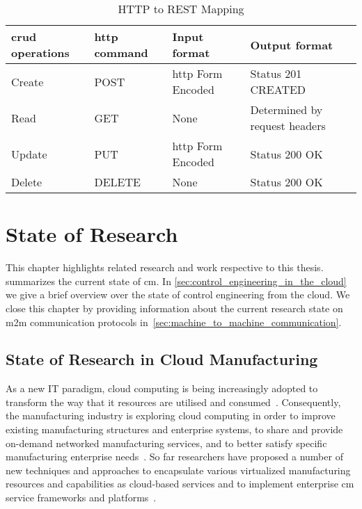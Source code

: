 \documentclass[
a4paper,
twoside,
headsepline,
cleardoublepage=empty,
parskip=half,
draft=false
]{scrbook}
\begin{document}
			\begin{table}[hbtp]
				\centering
				\caption{HTTP to REST Mapping}
				\label{tab:http_rest_mapping}
				\begin{tabular}{@{}llll@{}}
					\toprule
					\gls{crud} operations & \gls{http} command & Input format & Output format
					\\ \midrule
					Create & POST & \gls{http} Form Encoded & Status 201 CREATED
					\\ \midrule
					Read & GET & None & Determined by request headers 
					\\ \midrule
					Update & PUT & \gls{http} Form Encoded & Status 200 OK
					\\ \midrule
					Delete & DELETE & None & Status 200 OK
					\\ \bottomrule
				\end{tabular}
			\end{table}

	\chapter{State of Research} \label{ch:state_of_the_Science}

		This chapter highlights related research and work respective to this thesis.  summarizes the current state of \gls{cm}. In \cref{sec:control_engineering_in_the_cloud} we give a brief overview over the state of control engineering from the cloud. We close this chapter by providing information about the current research state on \gls{m2m} communication protocols in~\cref{sec:machine_to_machine_communication}.

		\section{State of Research in Cloud Manufacturing}\label{sec:state_of_science_cloud_manufacturing}

			As a new IT paradigm, cloud computing is being increasingly adopted to transform the way that \gls{it} resources are utilised and consumed~\cite{li2010cloud}. 
			Consequently, the manufacturing industry is exploring cloud computing in order to improve existing manufacturing structures and enterprise systems, to
			share and provide on-demand networked manufacturing services, and to better satisfy specific manufacturing enterprise needs~\cite{he2015state}.
			So far researchers have proposed a number of new techniques and approaches to encapsulate various virtualized manufacturing resources and capabilities as cloud-based services and to implement enterprise \gls{cm} service frameworks and platforms~\cite{tao2011cloud}.
			
\end{document}
